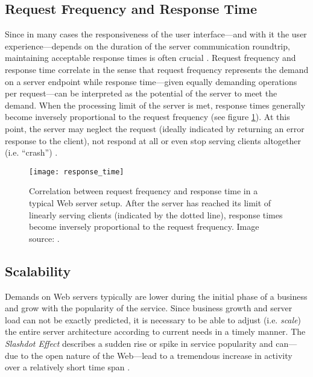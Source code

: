 \subsection{Request Frequency and Response Time}
\label{lab:frequency}
Since in many cases the responsiveness of the user interface---and with it the user experience---depends on the duration of the server communication roundtrip, maintaining acceptable response times is often crucial \cite[p. 1]{Nadimpalli2000}. Request frequency and response time correlate in the sense that request frequency represents the demand on a server endpoint while response time---given equally demanding operations per request---can be interpreted as the potential of the server to meet the demand. When the processing limit of the server is met, response times generally become inversely proportional to the request frequency (see figure \ref{fig:response_time}). At this point, the server may neglect the request (ideally indicated by returning an error response to the client), not respond at all or even stop serving clients altogether (i.e. ``crash'') \cite{http}.

\begin{figure}
\centering\small
\setlength{\tabcolsep}{0mm}
  \texttt{[image: response\_time]}
\caption{
Correlation between request frequency and response time in a typical Web server setup. After the server has reached its limit of linearly serving clients (indicated by the dotted line), response times become inversely proportional to the request frequency. Image source: \cite{response_time}.
}
\label{fig:response_time}
\end{figure}

\subsection{Scalability}
\label{lab:scalabilty}
Demands on Web servers typically are lower during the initial phase of a business and grow with the popularity of the service. Since business growth and server load can not be exactly predicted, it is necessary to be able to adjust (i.e. \textit{scale}) the entire server architecture according to current needs in a timely manner. The \textit{Slashdot Effect} describes a sudden rise or spike in service popularity and can---due to the open nature of the Web---lead to a tremendous increase in activity over a relatively short time span \cite[p. 1]{Drolia2010}.

